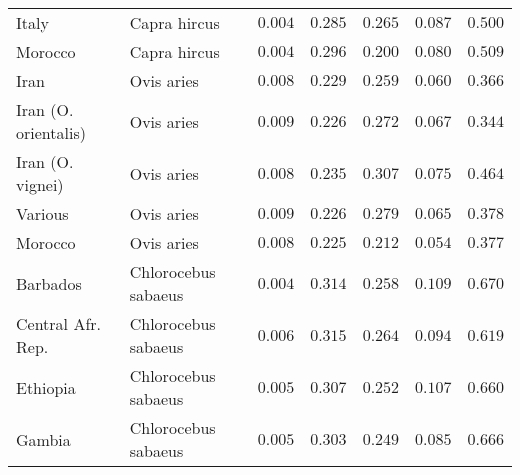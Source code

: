 \documentclass{article}
\begin{document}
\begin{center}
\begin{longtable}{|l|l|r|r|r|r|r|}
            Italy                & Capra hircus        & $ 0.004$              & $ 0.285$                  & $ 0.265$                & $ 0.087$                   & $ 0.500$                       \\
            Morocco              & Capra hircus        & $ 0.004$              & $ 0.296$                  & $ 0.200$                & $ 0.080$                   & $ 0.509$                       \\
            Iran                 & Ovis aries          & $ 0.008$              & $ 0.229$                  & $ 0.259$                & $ 0.060$                   & $ 0.366$                       \\
            Iran (O. orientalis) & Ovis aries          & $ 0.009$              & $ 0.226$                  & $ 0.272$                & $ 0.067$                   & $ 0.344$                       \\
            Iran (O. vignei)     & Ovis aries          & $ 0.008$              & $ 0.235$                  & $ 0.307$                & $ 0.075$                   & $ 0.464$                       \\
            Various              & Ovis aries          & $ 0.009$              & $ 0.226$                  & $ 0.279$                & $ 0.065$                   & $ 0.378$                       \\
            Morocco              & Ovis aries          & $ 0.008$              & $ 0.225$                  & $ 0.212$                & $ 0.054$                   & $ 0.377$                       \\
            Barbados             & Chlorocebus sabaeus & $ 0.004$              & $ 0.314$                  & $ 0.258$                & $ 0.109$                   & $ 0.670$                       \\
            Central Afr. Rep.    & Chlorocebus sabaeus & $ 0.006$              & $ 0.315$                  & $ 0.264$                & $ 0.094$                   & $ 0.619$                       \\
            Ethiopia             & Chlorocebus sabaeus & $ 0.005$              & $ 0.307$                  & $ 0.252$                & $ 0.107$                   & $ 0.660$                       \\
            Gambia               & Chlorocebus sabaeus & $ 0.005$              & $ 0.303$                  & $ 0.249$                & $ 0.085$                   & $ 0.666$                       \\

\end{longtable}
\end{center}
\end{document}
